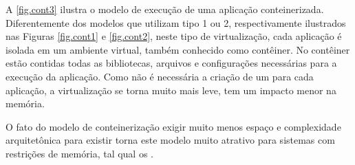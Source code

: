 A \autoref{fig.cont3} ilustra o modelo de execução de uma aplicação conteinerizada. Diferentemente dos modelos que utilizam \hypervisors tipo 1 ou 2, respectivamente ilustrados nas Figuras \ref{fig.cont1} e \ref{fig.cont2}, neste tipo de virtualização, cada aplicação é isolada em um ambiente virtual, também conhecido como contêiner. No contêiner estão contidas todas as bibliotecas, arquivos e configurações necessárias para a execução da aplicação. Como não é necessária a criação de um \so para cada aplicação, a virtualização se torna muito mais leve, \ie tem um impacto menor na memória.

O fato do modelo de conteinerização exigir muito menos espaço e complexidade arquitetônica para existir torna este modelo muito atrativo para sistemas com restrições de memória, tal qual os \lws.

